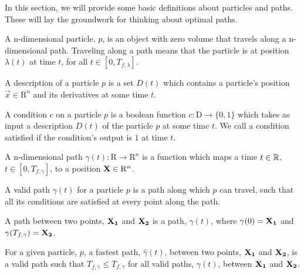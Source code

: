 In this section, we will provide some basic definitions about particles and paths. These will lay the groundwork for thinking about optimal paths.

\begin{definition}
  A n-dimensional particle, $p$, is an object with zero volume that travels along a n-dimensional path. Traveling along a path means that the particle is at position $\lambda(t)$ at time $t$, for all $t \in [0, T_{f,\lambda}]$. 
\end{definition}

\begin{definition}
A description of a particle $p$ is a set $D(t)$ which contains a particle's position $\vec{x} \in \mathrm{R}^n$ and its derivatives at some time $t$.
\end{definition}

\begin{definition}
A condition $c$ on a particle $p$ is a boolean function $c: \mathrm{D} \to \{0,1\}$ which takes as input a description $D(t)$ of the particle $p$ at some time $t$. We call a condition satisfied if the condition's output is $1$ at time $t$.
\end{definition}

\begin{definition}
A n-dimensional path $\gamma(t): \mathrm{R} \to \mathrm{R}^n$ is a function which maps a time $t \in \mathbb R$, $t \in [0, T_{f, \gamma}]$, to a position $\mathbf{X} \in \mathrm{R}^n$. 
\end{definition}

\begin{definition}
  A valid path $\gamma(t)$ for a particle $p$ is a path along which $p$ can travel, such that all its conditions are satisfied at every point along the path.
\end{definition}

\begin{definition}
  A path between two points, $\mathbf{X_1}$ and $\mathbf{X_2}$ is a path, $\gamma(t)$, where $\gamma(0) = \mathbf{X_1}$ and $\gamma(T_{f, \gamma}) = \mathbf{X_2}$.
\end{definition}

\begin{definition}
  For a given particle, $p$, a fastest path, $\hat{\gamma}(t)$, between two points, $\mathbf{X_1}$ and $\mathbf{X_2}$, is a valid path such that $T_{f,\hat{\gamma}} \leq T_{f,\gamma}$ for all valid paths, $\gamma(t)$, between $\mathbf{X_1}$ and $\mathbf{X_2}$.
\end{definition}

